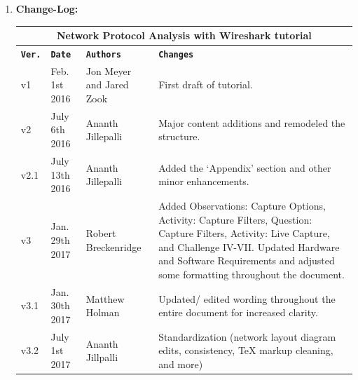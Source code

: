 \documentclass[12pt]{extarticle}
\begin{document}
\begin{enumerate}
		
		\pagebreak
		\vspace{8mm}
		\item \textbf{Change-Log:}
		\label{changelog}
		
		\vspace{6mm}
		
		\begin{tabular}{ |p{1cm}|p{3cm}|p{4cm}|p{7cm}|  }
			\hline
			\multicolumn{4}{|c|}{Network Protocol Analysis with Wireshark tutorial} \\
			\hline
			\texttt{\textbf{Ver.}} & \texttt{\textbf{Date}} & \texttt{\textbf{Authors}} & \texttt{\textbf{Changes}} \\
			\hline
			v1 & Feb. 1st 2016 & Jon Meyer and Jared Zook & First draft of tutorial. \\
			\hline
			v2 & July 6th 2016 & Ananth Jillepalli & Major content additions and remodeled the structure. \\
			\hline
			v2.1 & July 13th 2016 & Ananth Jillepalli & Added the `Appendix' section and other minor enhancements. \\
			\hline
			v3 & Jan. 29th 2017 & Robert Breckenridge & Added Observations: Capture Options, Activity: Capture Filters, Question: Capture Filters, Activity: Live Capture, and Challenge IV-VII. Updated Hardware and Software Requirements and adjusted some formatting throughout the document. \\
			\hline
			v3.1 & Jan. 30th 2017 & Matthew Holman & Updated/ edited wording throughout the entire document for increased clarity. \\
			\hline
			v3.2 & July 1st 2017 & Ananth Jillpalli & Standardization (network layout diagram edits, consistency, TeX markup cleaning, and more)  \\ \hline
			\end{tabular}
	
	\end{enumerate}
		
		
	
	\pagebreak
	
	
	
	
\end{document}
